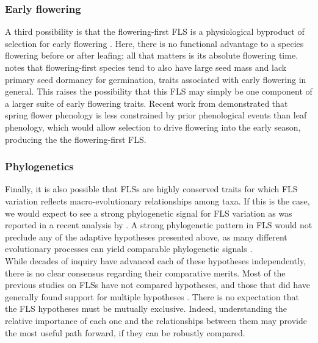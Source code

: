 \documentclass[11pt]{article}
\begin{document}
\subsubsection*{Early flowering}
\noindent A third possibility is that the flowering-first FLS is a physiological byproduct of selection for early flowering \citep{Primack1987}. Here, there is no functional advantage to a species flowering before or after leafing; all that matters is its absolute flowering time. \citet{Primack1987} notes that flowering-first species tend to also have large seed mass and lack primary seed dormancy for germination, traits associated with early flowering in general. This raises the possibility that this FLS may simply be one component of a larger suite of early flowering traits. Recent work from \citet{Savage2019} demonstrated that spring flower phenology is less constrained by prior phenological events than leaf phenology, which would allow selection to drive flowering into the early season, producing the the flowering-first FLS. %

\subsubsection*{Phylogenetics} 
\noindent Finally, it is also possible that FLSs are highly conserved traits for which FLS variation reflects macro-evolutionary relationships among taxa. If this is the case, we would expect to see a strong phylogenetic signal for FLS variation as was reported in a recent analysis by \citet{Gougherty2018}. A strong phylogenetic pattern in FLS would not preclude any of the adaptive hypotheses presented above, as  many different evolutionary processes can yield comparable phylogenetic signals \citep{Revell2008}. \\

\noindent While decades of inquiry have advanced each of these hypotheses independently, there is no clear consensus regarding their comparative merits. Most of the previous studies on FLSs have not compared hypotheses, and those that did have generally found support for multiple hypotheses \citep[see][]{Bolmgren2003,Gougherty2018}. There is no expectation that the FLS hypotheses must be mutually exclusive. Indeed, understanding the relative importance of each one and the relationships between them may provide the most useful path forward, if they can be robustly compared.\\
\end{document}
